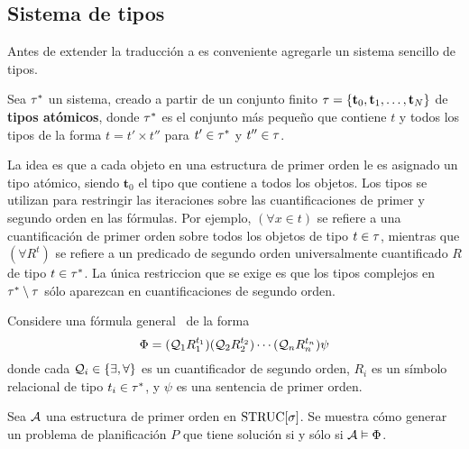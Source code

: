 \subsection{Sistema de tipos}
Antes de extender la traducción a \PH es conveniente agregarle un sistema
sencillo de tipos.

Sea $\tau^*$ un sistema, creado a partir de un conjunto finito 
$\tau=\{\mathbf{t}_0,\mathbf{t}_1,\ldots,\mathbf{t}_N\}$
de \textbf{tipos atómicos}, donde $\tau^*$ es el conjunto más pequeño que
contiene $t$ y todos los tipos de la forma $t=t'\times t''$
para $t'\in\tau^*$ y $t''\in\tau$.

La idea es que a cada objeto en una estructura de primer orden le es asignado
un tipo atómico, siendo $\mathbf{t}_0$ el tipo que contiene a todos los
objetos.
Los tipos se utilizan para restringir las iteraciones sobre las
cuantificaciones de primer y segundo orden en las fórmulas.
Por ejemplo, $(\forall x\in t)$ se refiere a una cuantificación de primer orden
sobre todos los objetos de tipo $t\in\tau$, mientras que
$(\forall R^t)$ se refiere a un predicado de segundo orden universalmente
cuantificado $R$ de tipo $t\in\tau^*$.
La única restriccion que se exige es que los tipos complejos en 
$\tau^*\setminus\tau$ sólo aparezcan en cuantificaciones de segundo orden.

Considere una fórmula general \LSO\ de la forma
\begin{equation}
\Phi = (\mathcal{Q}_1R_1^{t_1})(\mathcal{Q}_2R_2^{t_2})\cdots(\mathcal{Q}_nR_n^{t_n})\psi
\end{equation}
donde cada $\mathcal{Q}_i\in\{\exists,\forall\}$ es un cuantificador de segundo orden,
$R_i$ es un símbolo relacional de tipo $t_i\in\tau^*$,
y $\psi$ es una sentencia de primer orden.

Sea $\mathcal{A}$ una estructura de primer orden en $\text{STRUC}[\sigma]$.
Se muestra cómo generar un problema de planificación $P$ que tiene solución si
y sólo si $\mathcal{A}\vDash\Phi$.

